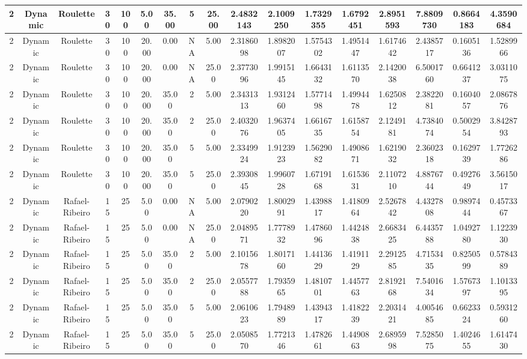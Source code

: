 \begin{longtable}{ | c | c | c | c | c | c | c | c | c | c | c | c | c | c | c | c | c | }
	\hline
	2	&	Dynamic	&	Roulette	&	30	&	100	&	5.00	&	35.00	&	5	&	25.00	&	2.4832143	&	2.1009250	&	1.7329355	&	1.6792451	&	2.8951593	&	7.8809730	&	0.8664183	&	4.3590684 \\
	\hline
	2	&	Dynamic	&	Roulette	&	30	&	100	&	20.00	&	0.00	&	NA	&	5.00	&	2.3186098	&	1.8982007	&	1.5754302	&	1.4951447	&	1.6174642	&	2.4385717	&	0.1605136	&	1.5289966 \\
	\hline
	2	&	Dynamic	&	Roulette	&	30	&	100	&	20.00	&	0.00	&	NA	&	25.00	&	2.3773096	&	1.9915145	&	1.6643132	&	1.6113570	&	2.1420038	&	6.5001760	&	0.6641237	&	3.0311075 \\
	\hline
	2	&	Dynamic	&	Roulette	&	30	&	100	&	20.00	&	35.00	&	2	&	5.00	&	2.3431313	&	1.9312460	&	1.5771498	&	1.4994478	&	1.6250812	&	2.3822081	&	0.1604057	&	2.0867876 \\
	\hline
	2	&	Dynamic	&	Roulette	&	30	&	100	&	20.00	&	35.00	&	2	&	25.00	&	2.4032076	&	1.9637405	&	1.6616735	&	1.6158754	&	2.1249181	&	4.7384074	&	0.5002954	&	3.8428793 \\
	\hline
	2	&	Dynamic	&	Roulette	&	30	&	100	&	20.00	&	35.00	&	5	&	5.00	&	2.3349924	&	1.9123923	&	1.5629082	&	1.4908671	&	1.6219032	&	2.3602318	&	0.1629739	&	1.7726286 \\
	\hline
	2	&	Dynamic	&	Roulette	&	30	&	100	&	20.00	&	35.00	&	5	&	25.00	&	2.3930845	&	1.9960728	&	1.6719168	&	1.6153631	&	2.1107210	&	4.8876744	&	0.4927649	&	3.5615017 \\
	\hline
	2	&	Dynamic	&	Rafael-Ribeiro	&	15	&	25	&	5.00	&	0.00	&	NA	&	5.00	&	2.0790220	&	1.8002991	&	1.4398817	&	1.4180964	&	2.5267842	&	4.4327808	&	0.9897444	&	0.4573367 \\
	\hline
	2	&	Dynamic	&	Rafael-Ribeiro	&	15	&	25	&	5.00	&	0.00	&	NA	&	25.00	&	2.0489571	&	1.7778932	&	1.4786096	&	1.4424838	&	2.6683425	&	6.4435788	&	1.0492780	&	1.1223930 \\
	\hline
	2	&	Dynamic	&	Rafael-Ribeiro	&	15	&	25	&	5.00	&	35.00	&	2	&	5.00	&	2.1015678	&	1.8017160	&	1.4413629	&	1.4191129	&	2.2912585	&	4.7153435	&	0.8250599	&	0.5784389 \\
	\hline
	2	&	Dynamic	&	Rafael-Ribeiro	&	15	&	25	&	5.00	&	35.00	&	2	&	25.00	&	2.0557788	&	1.7935965	&	1.4810701	&	1.4457763	&	2.8192168	&	7.5401634	&	1.5767397	&	1.1013395 \\
	\hline
	2	&	Dynamic	&	Rafael-Ribeiro	&	15	&	25	&	5.00	&	35.00	&	5	&	5.00	&	2.0610623	&	1.7948989	&	1.4394317	&	1.4182239	&	2.2031421	&	4.0054685	&	0.6623324	&	0.5931260 \\
	\hline
	2	&	Dynamic	&	Rafael-Ribeiro	&	15	&	25	&	5.00	&	35.00	&	5	&	25.00	&	2.0508570	&	1.7721346	&	1.4782661	&	1.4490863	&	2.6895998	&	7.5285075	&	1.4024655	&	1.6147430 \\

\end{longtable}
